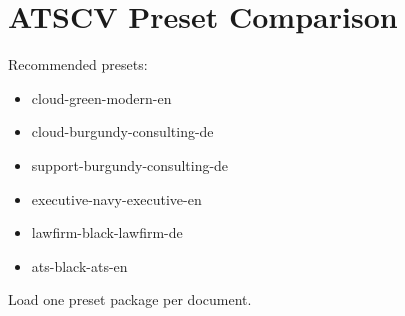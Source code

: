 \documentclass{atscv}
\begin{document}
\section*{ATSCV Preset Comparison}
Recommended presets:
\begin{itemize}
\item cloud-green-modern-en
\item cloud-burgundy-consulting-de
\item support-burgundy-consulting-de
\item executive-navy-executive-en
\item lawfirm-black-lawfirm-de
\item ats-black-ats-en
\end{itemize}
Load one preset package per document.
\end{document}
